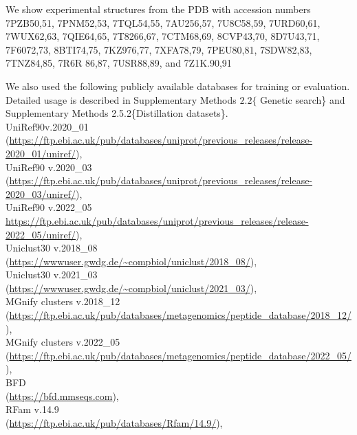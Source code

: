 \documentclass[10pt]{article}
\begin{document}
We show experimental structures from the PDB with accession numbers 7PZB50,51, 7PNM52,53, 7TQL54,55, 7AU256,57, 7U8C58,59, 7URD60,61, 7WUX62,63, 7QIE64,65, 7T8266,67, 7CTM68,69, 8CVP43,70, 8D7U43,71, 7F6072,73, 8BTI74,75, 7KZ976,77, 7XFA78,79, 7PEU80,81, 7SDW82,83, 7TNZ84,85, 7R6R 86,87, 7USR88,89, and 7Z1K.90,91

We also used the following publicly available databases for training or evaluation. Detailed usage is described in Supplementary Methods $2.2\{$ Genetic search\} and Supplementary Methods 2.5.2\{Distillation datasets\}.\\
UniRef90v.2020\_01 (\href{https://ftp.ebi.ac.uk/pub/databases/uniprot/previous_releases/release-2020_01/uniref/}{https://ftp.ebi.ac.uk/pub/databases/uniprot/previous\_releases/release-2020\_01/uniref/}),\\
UniRef90 v.2020\_03 (\href{https://ftp.ebi.ac.uk/pub/databases/uniprot/previous_releases/release-2020_03/uniref/}{https://ftp.ebi.ac.uk/pub/databases/uniprot/previous\_releases/release-2020\_03/uniref/}),\\
UniRef90 v.2022\_05\\
\href{https://ftp.ebi.ac.uk/pub/databases/uniprot/previous_releases/release-2022_05/uniref/}{https://ftp.ebi.ac.uk/pub/databases/uniprot/previous\_releases/release-2022\_05/uniref/}),\\
Uniclust30 v.2018\_08\\
(\href{https://wwwuser.gwdg.de/~compbiol/uniclust/2018_08/}{https://wwwuser.gwdg.de/\~{}compbiol/uniclust/2018\_08/}),\\
Uniclust30 v.2021\_03\\
(\href{https://wwwuser.gwdg.de/~compbiol/uniclust/2021_03/}{https://wwwuser.gwdg.de/\~{}compbiol/uniclust/2021\_03/}),\\
MGnify clusters v.2018\_12\\
(\href{https://ftp.ebi.ac.uk/pub/databases/metagenomics/peptide_database/2018_12/}{https://ftp.ebi.ac.uk/pub/databases/metagenomics/peptide\_database/2018\_12/}),\\
MGnify clusters v.2022\_05\\
(\href{https://ftp.ebi.ac.uk/pub/databases/metagenomics/peptide_database/2022_05/}{https://ftp.ebi.ac.uk/pub/databases/metagenomics/peptide\_database/2022\_05/}),\\
BFD\\
(\href{https://bfd.mmseqs.com}{https://bfd.mmseqs.com}),\\
RFam v.14.9\\
(\href{https://ftp.ebi.ac.uk/pub/databases/Rfam/14.9/}{https://ftp.ebi.ac.uk/pub/databases/Rfam/14.9/}),\\
\end{document}
